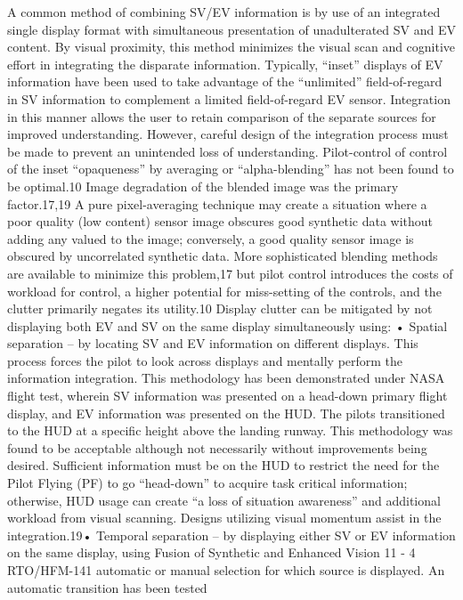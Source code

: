 \documentclass[utf8,bachelor,manualbib]{gradu3}
\begin{document}
A common method of combining SV/EV information is by use of an integrated single display format with
simultaneous presentation of unadulterated SV and EV content. By visual proximity, this method minimizes
the visual scan and cognitive effort in integrating the disparate information. Typically, “inset” displays of EV
information have been used to take advantage of the “unlimited” field-of-regard in SV information to
complement a limited field-of-regard EV sensor. Integration in this manner allows the user to retain
comparison of the separate sources for improved understanding. However, careful design of the integration
process must be made to prevent an unintended loss of understanding. Pilot-control of control of the inset
“opaqueness” by averaging or “alpha-blending” has not been found to be optimal.10 Image degradation of the
blended image was the primary factor.17,19 A pure pixel-averaging technique may create a situation where a
poor quality (low content) sensor image obscures good synthetic data without adding any valued to the image;
conversely, a good quality sensor image is obscured by uncorrelated synthetic data. More sophisticated
blending methods are available to minimize this problem,17 but pilot control introduces the costs of workload
for control, a higher potential for miss-setting of the controls, and the clutter primarily negates its utility.10
Display clutter can be mitigated by not displaying both EV and SV on the same display simultaneously using:
• Spatial separation – by locating SV and EV information on different displays. This process forces the
pilot to look across displays and mentally perform the information integration. This methodology has
been demonstrated under NASA flight test, wherein SV information was presented on a head-down
primary flight display, and EV information was presented on the HUD. The pilots transitioned to the
HUD at a specific height above the landing runway. This methodology was found to be acceptable
although not necessarily without improvements being desired. Sufficient information must be on the
HUD to restrict the need for the Pilot Flying (PF) to go “head-down” to acquire task critical
information; otherwise, HUD usage can create “a loss of situation awareness” and additional
workload from visual scanning. Designs utilizing visual momentum assist in the integration.19• Temporal separation – by displaying either SV or EV information on the same display, using
Fusion of Synthetic and Enhanced Vision
11 - 4 RTO/HFM-141
automatic or manual selection for which source is displayed. An automatic transition has been tested
\end{document}
